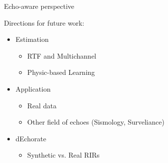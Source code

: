 \begin{frame}{Echo-aware perspective}

    Directions for future work:
    \begin{itemize}
        \item Estimation
        \begin{itemize}
            \item RTF and Multichannel \blaster
            \item Physic-based Learning
        \end{itemize}
        \item Application
        \begin{itemize}
            \item Real data
            \item Other field of echoes (Sismology, Surveliance)
        \end{itemize}
        \item dEchorate
        \begin{itemize}
            \item Synthetic vs. Real RIRs
        \end{itemize}
    \end{itemize}

\end{frame}


